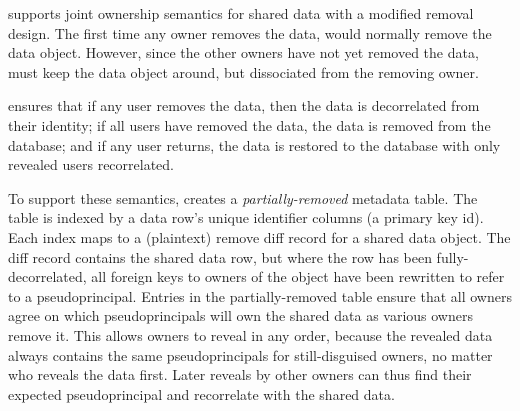 \sys supports joint ownership semantics for shared data with a modified removal
design.
%
The first time any owner removes the data, \sys would normally remove the data
object. However, since the other owners have not yet removed the data, \sys
must keep the data object around, but dissociated from the removing owner.
%

%
\sys ensures that \one{} if any user removes the data, then the data is
decorrelated from their identity; \two{} if all users have removed the data, the
data is removed from the database; and \three{} if any user returns, the data is
restored to the database with only revealed users recorrelated.  
%

%
To support these semantics, \sys creates a \emph{partially-removed} metadata
table. The table is indexed by a data row's unique identifier columns (\eg a
primary key id). Each index maps to a (plaintext) remove diff record for a
shared data object. The diff record contains the shared data row, but where the
row has been fully\--decorrelated, all foreign keys to owners of the object have
been rewritten to refer to a pseudoprincipal.
%
Entries in the partially-removed table ensure that all owners agree on which
pseudoprincipals will own the shared data as various owners remove it.
%
%
This allows owners to reveal in any order, because the revealed data always
contains the same pseudoprincipals for still-disguised owners, no matter who
reveals the data first.
%
Later reveals by other owners can thus find their expected pseudoprincipal and
recorrelate with the shared data.
%

